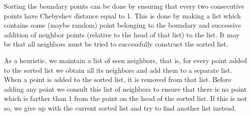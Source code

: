 \documentclass[reprint,amsmath,amssymb,aps,pre,showkeys,showpacs]{revtex4-1}
\begin{document}
Sorting the boundary points can be done by ensuring that every two consecutive
points have Chebyshev distance equal to 1. This is done by making a list which
contains some (maybe random) point belonging to the boundary and successive
addition of neighbor points (relative to the head of that list) to the list. It
may be that all neighbors must be tried to successfully construct the sorted
list.

As a heuristic, we maintain a list of seen neighbors, that is, for every point
added to the sorted list we obtain all its neighbors and add them to a separate
list. When a point is added to the sorted list, it is removed from that
list. Before adding any point we consult this list of neighbors to ensure that
there is no point which is farther than 1 from the point on the head of the
sorted list. If this is not so, we give up with the current sorted list and try
to find another list instead.
\end{document}
